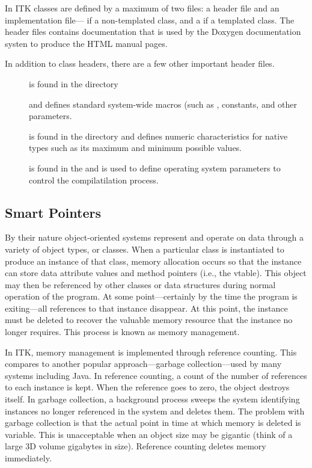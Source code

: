 In ITK classes are defined by a maximum of two files: a header  file
and an implementation file--- if a non-templated class, and a
 if a templated class. The header files contains documentation that
is used by the Doxygen documentation systen to produce the HTML manual pages.

In addition to class headers, there are a few other important header files.
\begin{description}
        \item[] is found in the  directory

        and defines standard system-wide macros (such as ,
        constants, and other parameters.

        \item[] is found in the  
        directory and defines numeric characteristics for native types such
        as its maximum and minimum possible values.

        \item[] is found in the  
        and is used to define operating system parameters to control
        the compilatilation process.
\end{description}

\subsection{Smart Pointers}
\label{sec:SmartPointers}

By their nature object-oriented systems represent and operate on data through
a variety of object types, or classes. When a particular class is
instantiated to produce an instance of that class, memory allocation occurs
so that the instance can store data attribute values and method pointers
(i.e., the vtable). This object may then be referenced by other classes or
data structures during normal operation of the program. At some
point---certainly by the time the program is exiting---all references to that
instance disappear. At this point, the instance must be deleted to recover
the valuable memory resource that the instance no longer requires. This process
is known as memory management.

In ITK, memory management is implemented through reference counting. This
compares to another popular approach---garbage collection---used by many
systems including Java. In reference counting, a count of the number of
references to each instance is kept. When the reference goes to zero, the
object destroys itself. In garbage collection, a background process sweeps
the system identifying instances no longer referenced in the system and
deletes them. The problem with garbage collection is that the actual point in
time at which memory is deleted is variable. This is unacceptable when an
object size may be gigantic (think of a large 3D volume gigabytes in
size). Reference counting deletes memory immediately.


